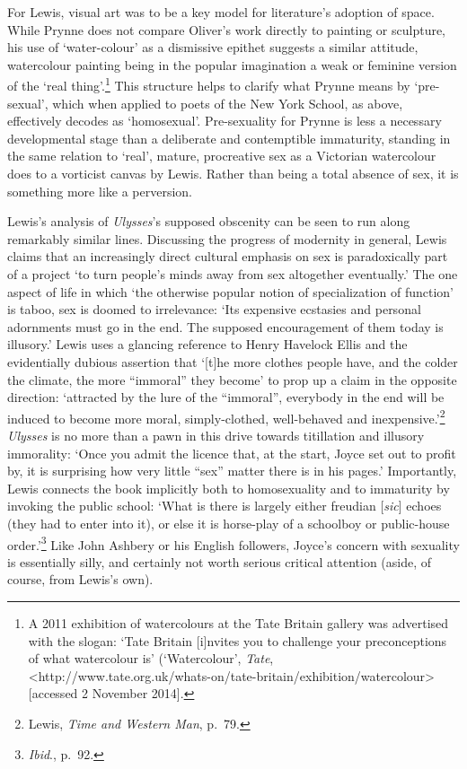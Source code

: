 \documentclass[]{article}
\begin{document}
For Lewis, visual art was to be a key model for literature's adoption of
space. While Prynne does not compare Oliver's work directly to painting
or sculpture, his use of `water-colour' as a dismissive epithet suggests
a similar attitude, watercolour painting being in the popular
imagination a weak or feminine version of the `real thing'.\footnote{A
  2011 exhibition of watercolours at the Tate Britain gallery was
  advertised with the slogan: `Tate Britain {[}i{]}nvites you to
  challenge your preconceptions of what watercolour is' (`Watercolour',
  \emph{Tate},
  \textless{}http://www.tate.org.uk/whats-on/tate-britain/exhibition/watercolour\textgreater{}
  {[}accessed 2 November 2014{]}.} This structure helps to clarify what
Prynne means by `pre-sexual', which when applied to poets of the New
York School, as above, effectively decodes as `homosexual'.
Pre-sexuality for Prynne is less a necessary developmental stage than a
deliberate and contemptible immaturity, standing in the same relation to
`real', mature, procreative sex as a Victorian watercolour does to a
vorticist canvas by Lewis. Rather than being a total absence of sex, it
is something more like a perversion.

Lewis's analysis of \emph{Ulysses}'s supposed obscenity can be seen to
run along remarkably similar lines. Discussing the progress of modernity
in general, Lewis claims that an increasingly direct cultural emphasis
on sex is paradoxically part of a project `to turn people's minds away
from sex altogether eventually.' The one aspect of life in which `the
otherwise popular notion of specialization of function' is taboo, sex is
doomed to irrelevance: `Its expensive ecstasies and personal adornments
must go in the end. The supposed encouragement of them today is
illusory.' Lewis uses a glancing reference to Henry Havelock Ellis and
the evidentially dubious assertion that `{[}t{]}he more clothes people
have, and the colder the climate, the more ``immoral'' they become' to
prop up a claim in the opposite direction: `attracted by the lure of the
``immoral'', everybody in the end will be induced to become more moral,
simply-clothed, well-behaved and inexpensive.'\footnote{Lewis,
  \emph{Time and Western Man}, p.~79.} \emph{Ulysses} is no more than a
pawn in this drive towards titillation and illusory immorality: `Once
you admit the licence that, at the start, Joyce set out to profit by, it
is surprising how very little ``sex'' matter there is in his pages.'
Importantly, Lewis connects the book implicitly both to homosexuality
and to immaturity by invoking the public school: `What is there is
largely either freudian {[}\emph{sic}{]} echoes (they had to enter into
it), or else it is horse-play of a schoolboy or public-house
order.'\footnote{\emph{Ibid}., p.~92.} Like John Ashbery or his English
followers, Joyce's concern with sexuality is essentially silly, and
certainly not worth serious critical attention (aside, of course, from
Lewis's own).
\end{document}
